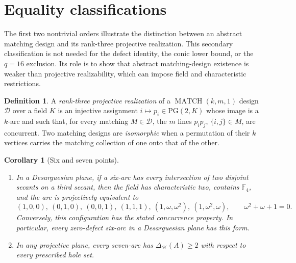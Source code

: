 \documentclass[11pt]{article}
\newtheorem{corollary}[theorem]{Corollary}
\theoremstyle{definition}
\newtheorem{definition}[theorem]{Definition}
\theoremstyle{remark}
\newcommand{\PG}{\mathrm{PG}}
\newcommand{\F}{\mathbb{F}}
\newcommand{\cH}{\mathcal{H}}
\begin{document}
\appendix

\section{Equality classifications}
\label{sec:equality-classifications}

The first two nontrivial orders illustrate the distinction between an
abstract matching design and its rank-three projective realization.
This secondary classification is not needed for the defect identity, the
conic lower bound, or the \(q=16\) exclusion.  Its role is to show that
abstract matching-design existence is weaker than projective
realizability, which can impose field and characteristic restrictions.

\begin{definition}\label{def:rank-three-realization}
A \emph{rank-three projective realization} of a
\(\operatorname{MATCH}(k,m,1)\) design \(\mathcal D\) over a field \(K\)
is an injective assignment \(i\mapsto p_i\in\PG(2,K)\) whose image is a
\(k\)-arc and such that, for every matching \(M\in\mathcal D\), the \(m\)
lines \(p_ip_j\), \(\{i,j\}\in M\), are concurrent.  Two matching designs
are \emph{isomorphic} when a permutation of their \(k\) vertices carries
the matching collection of one onto that of the other.
\end{definition}

\begin{corollary}[Six and seven points]
\label{cor:six-seven-rigidity}
\begin{enumerate}[label=(\alph*),leftmargin=2em]
\item In a Desarguesian plane, if a six-arc has every intersection of two
disjoint secants on a third secant, then the field has characteristic two,
contains $\F_4$, and the arc is projectively equivalent to
\[
 (1,0,0),\ (0,1,0),\ (0,0,1),\ (1,1,1),\
 (1,\omega,\omega^2),\ (1,\omega^2,\omega),
 \qquad \omega^2+\omega+1=0.
\]
Conversely, this configuration has the stated concurrence property.
In particular, every zero-defect six-arc in a Desarguesian plane has this
form.
\item In any projective plane, every seven-arc has
\(\Delta_{\cH}(A)\ge2\) with respect to every prescribed hole set.
\end{enumerate}
\end{corollary}
\end{document}
